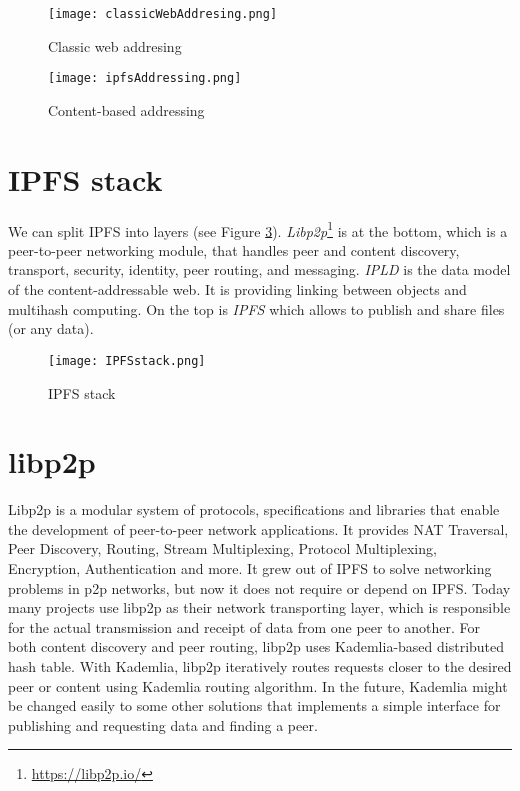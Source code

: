 \begin{figure}[h]
    \centering
    \texttt{[image: classicWebAddresing.png]}
    \caption{Classic web addresing}
    \label{webAddressing}
\end{figure}

\begin{figure}[h]
    \centering
    \texttt{[image: ipfsAddressing.png]}
    \caption{Content-based addressing}
    \label{ipfsAddressing}
\end{figure}

\section{IPFS stack}
We can split IPFS into layers (see Figure \ref{IPFSstack}). \textit{Libp2p}\footnote{\url{https://libp2p.io/}} is at the bottom, which is a peer-to-peer networking module, that handles peer and content discovery, transport, security, identity, peer routing, and messaging. \textit{IPLD} is the data model of the content-addressable web. It is providing linking between objects and multihash computing. On the top is \textit{IPFS} which allows to publish and share files (or any data).\cite{IPFSwhitepaper}


\begin{figure}[h]
    \centering
    \texttt{[image: IPFSstack.png]}
    \caption{IPFS stack}
    \label{IPFSstack}
\end{figure}


\section{libp2p}
Libp2p is a modular system of protocols, specifications and libraries that enable the development of peer-to-peer network applications. It provides NAT Traversal, Peer Discovery, Routing, Stream Multiplexing, Protocol Multiplexing, Encryption, Authentication and more. It grew out of IPFS to solve networking problems in p2p networks, but now it does not require or depend on IPFS. Today many projects use libp2p as their network transporting layer, which is responsible for the actual transmission and receipt of data from one peer to another. For both content discovery and peer routing, libp2p uses Kademlia-based distributed hash table. With Kademlia, libp2p iteratively routes requests closer to the desired peer or content using Kademlia routing algorithm\cite{kademlia}. In the future, Kademlia might be changed easily to some other solutions that implements a simple interface for publishing and requesting data and finding a peer.\cite{WebEngineering}



